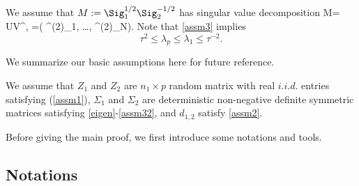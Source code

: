 We assume that $M:=\Sig_1^{1/2} \Sig_2^{-1/2}$ has singular value decomposition
\be\label{eigen2}
M= U\Lambda V^\top, \quad \Lambda=( \lambda^{(2)}_1, \ldots, \lambda^{(2)}_N).
\ee
Note that \eqref{assm3} implies  
\begin{equation}\label{assm32}
\tau^2 \le \lambda_p \le \lambda_1 \le \tau^{-2}. %
\end{equation}


We summarize our basic assumptions here for future reference.
\begin{assumption}\label{assm_big1}
We assume that $Z_1$ and $Z_2$ are $n_1\times p$ random matrix with real $i.i.d.$ entries satisfying (\ref{assm1}), $\Sigma_1$ and $\Sigma_2$ are deterministic non-negative definite symmetric matrices satisfying \eqref{eigen}-\eqref{assm32}, and $d_{1,2}$ satisfy \eqref{assm2}.
\end{assumption}


Before giving the main proof, we first introduce some notations and tools. 


\subsection{Notations}

%



